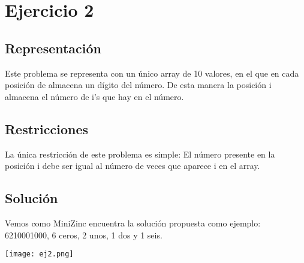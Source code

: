 \section{Ejercicio 2}
\subsection{Representación}
Este problema se representa con un único array de 10 valores, en el que en cada posición de almacena un dígito del número. De esta manera la posición i almacena el número de i's que hay en el número.

\subsection{Restricciones}
La única restricción de este problema es simple: El número presente en la posición i debe ser igual al número de veces que aparece i en el array.

\subsection{Solución}
Vemos como MiniZinc encuentra la solución propuesta como ejemplo: 6210001000, 6 ceros, 2 unos, 1 dos y 1 seis.

\texttt{[image: ej2.png]}
